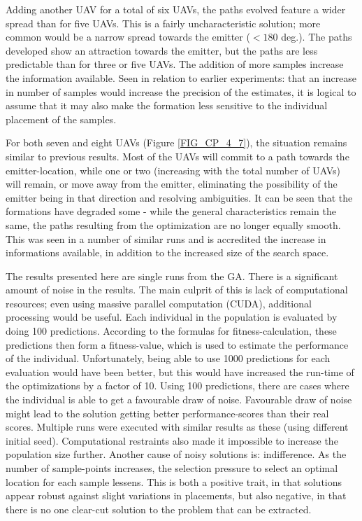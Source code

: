 \documentclass[10pt,a4paper]{book}
\begin{document}
Adding another \gls{UAV} for a total of six \glspl{UAV}, the paths evolved feature a wider spread than for five \glspl{UAV}. This is a fairly uncharacteristic solution; more common would be a narrow spread towards the emitter ($< 180$ deg.). The paths developed show an attraction towards the emitter, but the paths are less predictable than for three or five \glspl{UAV}. The addition of more samples increase the information available. Seen in relation to earlier experiments: that an increase in number of samples would increase the precision of the estimates, it is logical to assume that it may also make the formation less sensitive to the individual placement of the samples.

For both seven and eight \glspl{UAV} (Figure \ref{FIG_CP_4_7}), the situation remains similar to previous results. Most of the \glspl{UAV} will commit to a path towards the emitter-location, while one or two (increasing with the total number of \glspl{UAV}) will remain, or move away from the emitter, eliminating the possibility of the emitter being in that direction and resolving ambiguities. It can be seen that the formations have degraded some - while the general characteristics remain the same, the paths resulting from the optimization are no longer equally smooth. This was seen in a number of similar runs and is accredited the increase in informations available, in addition to the increased size of the search space. 

The results presented here are single runs from the \gls{GA}. There is a significant amount of noise in the results. The main culprit of this is lack of computational resources; even using massive parallel computation (\gls{CUDA}), additional processing would be useful. Each individual in the population is evaluated by doing 100 predictions. According to the formulas for fitness-calculation, these predictions then form a fitness-value, which is used to estimate the performance of the individual. Unfortunately, being able to use 1000 predictions for each evaluation would have been better, but this would have increased the run-time of the optimizations by a factor of 10. Using 100 predictions, there are cases where the individual is able to get a favourable draw of noise. Favourable draw of noise might lead to the solution getting better performance-scores than their real scores. Multiple runs were executed with similar results as these (using different initial seed). Computational restraints also made it impossible to increase the population size further.
\newpage
Another cause of noisy solutions is: indifference. As the number of sample-points increases, the selection pressure to select an optimal location for each sample lessens. This is both a positive trait, in that solutions appear robust against slight variations in placements, but also negative, in that there is no one clear-cut solution to the problem that can be extracted.
\end{document}
